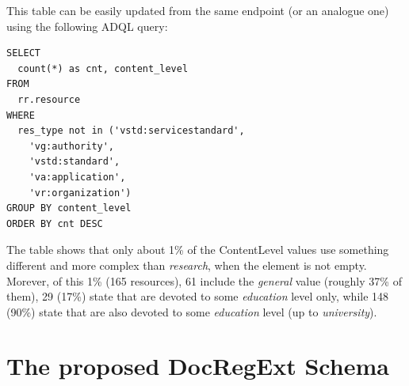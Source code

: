 \documentclass{ivoa}
\begin{document}
This table can be easily updated from the same endpoint (or an analogue 
one) using the following ADQL query:

\begin{verbatim}
SELECT 
  count(*) as cnt, content_level
FROM 
  rr.resource
WHERE
  res_type not in ('vstd:servicestandard',
    'vg:authority',
    'vstd:standard',
    'va:application',
    'vr:organization')
GROUP BY content_level
ORDER BY cnt DESC
\end{verbatim}

The table shows that only about 1\% of the ContentLevel values use 
something different and more complex than 
\emph{research}, when 
the element is not empty. Morever, of this 1\% (165 resources), 
61 include the \emph{general} value (roughly 37\% of them), 
29 (17\%) state that are devoted to some 
\emph{education} level only,
while 148 (90\%) state that are also devoted to some 
\emph{education} level (up to 
\emph{university}).


\section{The proposed DocRegExt Schema}

\label{app:schema}




\end{document}
